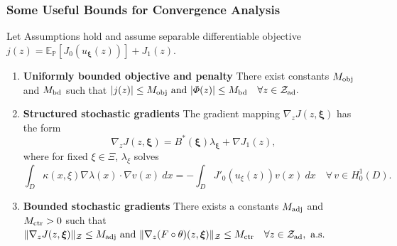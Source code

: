 \documentclass[aspectratio=169,xcolor=dvipsnames,11pt]{beamer}
\newcommand{\dd}{\:d}
\newcommand{\dif}{\dd}
\newcommand{\setZ}{\mathcal{Z}}
\newcommand{\xibold}{\mathbold{\xi}}
\newcommand{\scrZ}{\mathcal{Z}}
\begin{document}
\begin{footnotesize}
\begin{frame}\frametitle{Some Useful Bounds for Convergence Analysis}
\pause
\begin{theorem}\label{prop:stoch-bds}
  Let  Assumptions hold and assume separable differentiable objective $  j(z) = \mathbb E_{\mathbb P}[J_0(u_{\xibold}(z))] + J_1(z)$.
  \begin{enumerate}
  \item \pause \textbf{Uniformly bounded objective and penalty} There exist constants $M_{\rm obj}$ and $M_{\rm bd}$ such that
  $
    |j(z)| \le M_{\rm obj} \text{ and }
    |\Phi(z)| \le M_{\rm bd} \quad \forall z \in \setZ_{\rm ad}.
    $
  \item \pause \textbf{Structured stochastic gradients} The gradient mapping $\nabla_z J(z,\xibold)$ has the form
  \[
    \nabla_z J(z,\xibold) = B^*(\xibold) \lambda_{\xibold} + \nabla J_1(z),
  \]
  where for fixed $\xi\in\Xi$,  $\lambda_{\xi}$ solves
  \[
  \int_{D} \kappa(x,\xi)\nabla \lambda(x) \cdot \nabla v(x) \dif x  = -\int_{D} J'_0(u_{\xi}(z))v(x)  \dif x
    \quad\forall\,v\in H_0^1(D).
    \]
  \item \pause \textbf{Bounded stochastic gradients} There exists a constants $M_{\rm adj}$ and  $M_{\rm ctr} > 0$ such that
  $
    \| \nabla_z J(z,\xibold) \|_{\scrZ} \le  M_{\rm adj} \text{ and }
     \| \nabla_z (F \circ \theta)(z,\xibold) \|_{\scrZ} \le  M_{\rm ctr}\quad
    \forall z \in \setZ_{\rm ad},\text{ a.s.}
    $
  \end{enumerate}
\end{theorem}
\end{frame}


\end{footnotesize}
\end{document}
